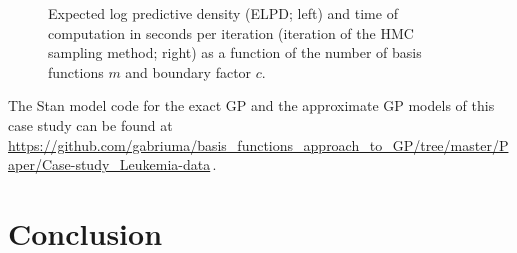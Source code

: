 \documentclass[onecolumn,a4paper,11pt]{article}
\begin{document}
\begin{figure}
\caption{Expected log predictive density (ELPD; left) and time of computation in seconds per iteration (iteration of the HMC sampling method; right) as a function of the number of basis functions $m$ and boundary factor $c$.}
  \label{ch5_fig22_elpd_leukemia}
\end{figure}

The Stan model code for the exact GP and the approximate GP models of this case study can be found at {\small \url{https://github.com/gabriuma/basis_functions_approach_to_GP/tree/master/Paper/Case-study_Leukemia-data}}\,.
%

\section{Conclusion}\label{ch5_sec_conclusion}
\end{document}
